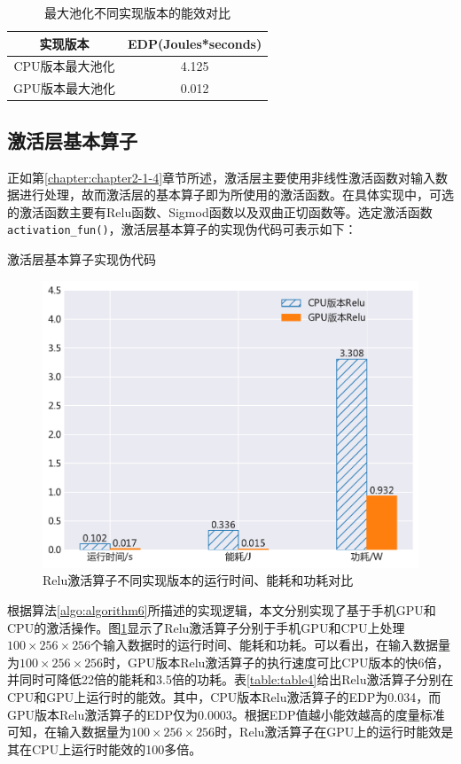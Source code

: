 \begin{table}[htbp]
  \centering
  \caption{最大池化不同实现版本的能效对比}
  \label{table:table3}
  \begin{tabular}{cc}
    \toprule
      实现版本 & EDP(Joules*seconds) \\
    \midrule
      CPU版本最大池化 & 4.125 \\
      GPU版本最大池化 & 0.012 \\
    \bottomrule
  \end{tabular}
\end{table}

\subsection{激活层基本算子}

正如第\ref{chapter:chapter2-1-4}章节所述，激活层主要使用非线性激活函数对输入数据进行处理，故而激活层的基本算子即为所使用的激活函数。在具体实现中，可选的激活函数主要有Relu函数、Sigmod函数以及双曲正切函数等。选定激活函数\texttt{activation\_fun()}，激活层基本算子的实现伪代码可表示如下：

\begin{algorithm}[htbp]
  \small
  \SetAlgoLined
  \caption{激活层基本算子实现伪代码}
  \label{algo:algorithm6}
\end{algorithm}

\begin{figure}[htb]
    \begin{center}
    \includegraphics[height=0.4\textwidth]{figures/relu_energy.pdf}
    \end{center}
    \caption{Relu激活算子不同实现版本的运行时间、能耗和功耗对比}\label{figure:figure13}
\end{figure}

根据算法\ref{algo:algorithm6}所描述的实现逻辑，本文分别实现了基于手机GPU和CPU的激活操作。图\ref{figure:figure13}显示了Relu激活算子分别于手机GPU和CPU上处理$100 \times 256 \times 256 $个输入数据时的运行时间、能耗和功耗。可以看出，在输入数据量为$100 \times 256 \times 256 $时，GPU版本Relu激活算子的执行速度可比CPU版本的快6倍，并同时可降低22倍的能耗和3.5倍的功耗。表\ref{table:table4}给出Relu激活算子分别在CPU和GPU上运行时的能效。其中，CPU版本Relu激活算子的EDP为0.034，而GPU版本Relu激活算子的EDP仅为0.0003。根据EDP值越小能效越高的度量标准可知，在输入数据量为$100 \times 256 \times 256 $时，Relu激活算子在GPU上的运行时能效是其在CPU上运行时能效的100多倍。

